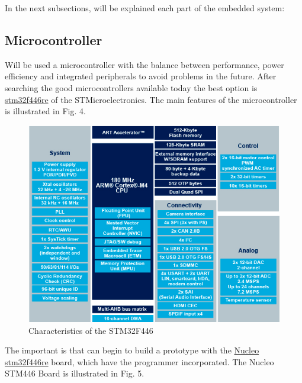 \documentclass[10pt,journal,compsoc]{IEEEtran}
\begin{document}
\hfil

In the next subsections, will be explained each part of the embedded system:

\hfil

\subsection{Microcontroller}
Will be used a microcontroller with the balance between performance, power efficiency and integrated peripherals to avoid problems in the future. After searching the good microcontrollers available today the best option is \href{http://www.st.com/en/microcontrollers/stm32f446re.html}{stm32f446re} of the STMicroelectronics. The main features of the microcontroller is illustrated in Fig. 4.

\begin{figure}[h]
  \centering
  \captionsetup{justification=centering}
  \includegraphics[scale=.45]{es3}
  \caption{Characteristics of the STM32F446}
  \label{fig:fig4}
\end{figure}

\hfil

The important is that can begin to build a prototype with the \href{http://www.st.com/en/evaluation-tools/nucleo-f446re.html}{Nucleo stm32f446re} board, which have the programmer incorporated. The Nucleo STM446 Board is illustrated in Fig. 5.
\end{document}
